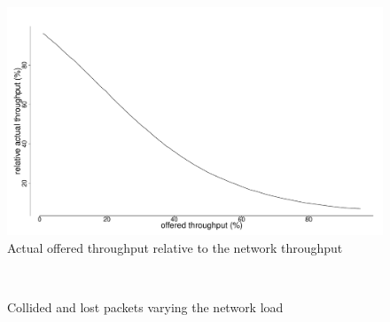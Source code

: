 \documentclass[conference]{IEEEtran}
\begin{document}
\begin{figure}[t]
    \centering
    \includegraphics[width=\columnwidth]{graphs/Sim3}
    \caption{Actual offered throughput relative to the network throughput}
    \label{grph:sim3}
\end{figure}

\begin{figure}[t]
    \centering
    \\
    \caption{Collided and lost packets varying the network load}
    \label{grph:sim56}
\end{figure}
\end{document}
